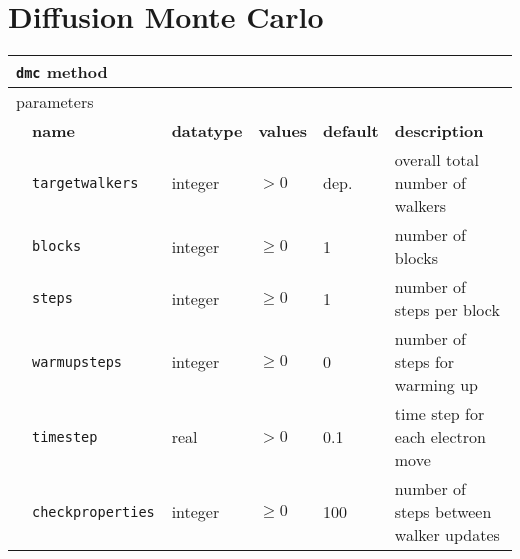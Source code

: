 \section{Diffusion Monte Carlo}
\label{sec:dmc}
\pagebreak
\begin{table}[h]
\begin{center}
\begin{tabularx}{\textwidth}{l l l l l l }
\hline
\multicolumn{6}{l}{\texttt{dmc} method} \\
\hline
\multicolumn{2}{l}{parameters}  & \multicolumn{4}{l}{}\\
   &   \bfseries name     & \bfseries datatype & \bfseries values & \bfseries default   & \bfseries description \\
   &   \texttt{targetwalkers             } &  integer  & $> 0$ & dep.   & overall total number of walkers \\
   &   \texttt{blocks              } &  integer  & $\ge 0$ & 1   & number of blocks            \\
   &   \texttt{steps               } &  integer  & $\ge 0$ & 1   & number of steps per block   \\
   &   \texttt{warmupsteps         } &  integer  & $\ge 0$ & 0   & number of steps for warming up\\
   &   \texttt{timestep            } &  real     & $> 0$ & 0.1 & time step for each electron move \\
   &   \texttt{checkproperties     } &  integer  & $\ge 0$ & 100   & number of steps between walker updates  \\

\end{tabularx}
\end{center}
\end{table}
